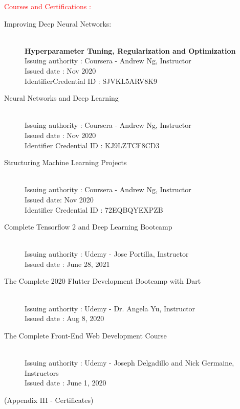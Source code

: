 \documentclass[a4paper]{article}
\begin{document}
\pagebreak
\vskip 0.5cm
\textcolor{red}{\huge Courses  and Certifications     :\hfill }\\
\vskip 0.3cm
\hskip 1cm
\begin{minipage}{0.95\textwidth}
\begin{description}
\item[Improving Deep Neural Networks:] \hfill \\
  {\bf Hyperparameter Tuning, Regularization and Optimization}\hfill\\
Issuing authority : Coursera - Andrew Ng, Instructor\\
Issued date : Nov 2020\\
IdentifierCredential ID : SJVKL5ARV8K9 
\item[Neural Networks and Deep Learning]\hfill\\
Issuing authority  : Coursera - Andrew Ng, Instructor\\
Issued date : Nov 2020\\
Identifier Credential ID : KJ9LZTCF8CD3
\item[Structuring Machine Learning Projects]\hfill\\
Issuing authority : Coursera - Andrew Ng, Instructor\\
Issued date: Nov 2020\\
Identifier Credential ID : 72EQBQYEXPZB
\item[Complete Tensorflow 2 and Deep Learning Bootcamp] \hfill\\
  Issuing authority : Udemy - Jose Portilla, Instructor\\
  Issued date : June 28, 2021
\item[The Complete 2020 Flutter Development Bootcamp with Dart]\hfill\\
  Issuing authority : Udemy - Dr. Angela Yu, Instructor\\
  Issued date : Aug 8, 2020
\item[The Complete Front-End Web Development Course]\hfill\\
Issuing authority : Udemy - Joseph Delgadillo and Nick Germaine, Instructors\\
Issued date : June 1, 2020
\end{description}
\end{minipage}



(Appendix III - Certificates)\\
\end{document}
